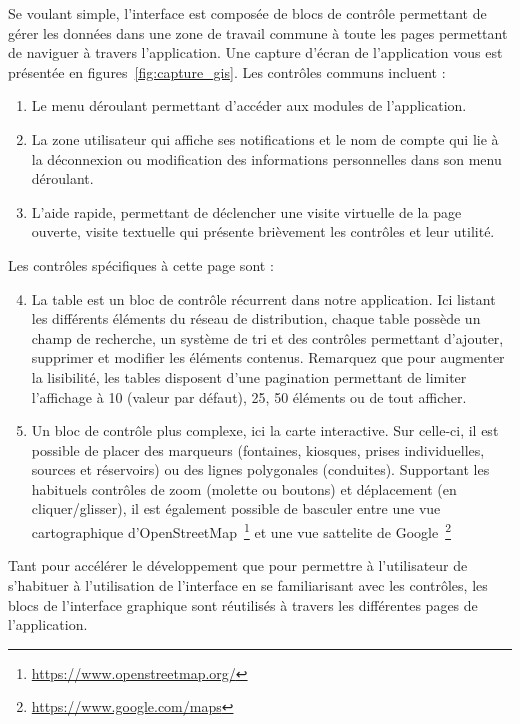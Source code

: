 \documentclass{EPL-master-thesis-covers-FR}
\begin{document}
			Se voulant simple, l'interface est composée de blocs de contrôle permettant de gérer les données dans une zone de travail commune à toute les pages permettant de naviguer à travers l'application. Une capture d'écran de l'application vous est présentée en figures~\ref{fig:capture_gis}. Les contrôles communs incluent :
			\begin{enumerate}
				\item Le menu déroulant permettant d'accéder aux modules de l'application.
				\item La zone utilisateur qui affiche ses notifications et le nom de compte qui lie à la{} déconnexion ou modification des informations personnelles dans son menu déroulant.
				\item L'aide rapide, permettant de déclencher une visite virtuelle de la page ouverte, visite textuelle qui présente brièvement les contrôles et leur utilité.
			\end{enumerate}

			Les contrôles spécifiques à cette page sont :
			\begin{enumerate}\setcounter{enumi}{3} %
				\item La table est un bloc de contrôle récurrent dans notre application. Ici listant les différents éléments du réseau de distribution, chaque table possède un champ de recherche, un système de tri et des contrôles permettant d'ajouter, supprimer et modifier les éléments contenus. Remarquez que pour augmenter la lisibilité, les tables disposent d'une pagination permettant de limiter l'affichage à 10 (valeur par défaut), 25, 50 éléments ou de tout afficher.
				\item Un bloc de contrôle plus complexe, ici la carte interactive. Sur celle-ci, il est possible de placer des marqueurs (fontaines, kiosques, prises individuelles, sources et réservoirs) ou des lignes polygonales (conduites). Supportant les habituels contrôles de zoom (molette ou boutons) et déplacement (en cliquer/glisser), il est également possible de basculer entre une vue cartographique d'OpenStreetMap~\footnote{\url{https://www.openstreetmap.org/}} et une vue sattelite de Google~\footnote{\url{https://www.google.com/maps}}
			\end{enumerate}

			Tant pour accélérer le développement que pour permettre à l'utilisateur de s'habituer à l'utilisation de l'interface en se familiarisant avec les contrôles, les blocs de l'interface graphique sont réutilisés à travers les différentes pages de l'application.
\end{document}
